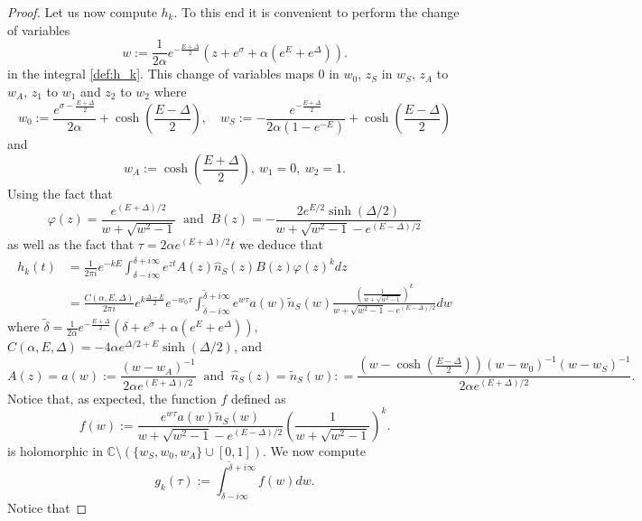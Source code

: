 \documentclass{article}
\numberwithin{equation}{section}
\theoremstyle{plain}
\begin{document}
\begin{proof}
Let us now compute $h_k$. To this end it is convenient to perform the change of variables
\[
w:= \frac{1}{2 \alpha}  e^{ - \frac{E+ \Delta}{2}} \left( z+ e^\sigma + \alpha (e^{E} + e^{\Delta} )  \right).
\]
in the integral \eqref{def:h_k}. 
This change of variables maps $0 $ in $w_0$, $z_S $ in $w_S $, $z_A $ to $w_A$, $z_1$ to $w_1 $ and $z_2 $ to $w_2 $ where  
\begin{equation} \label{poles in new variables}
w_0:=\frac{e^{ \sigma - \frac{E+ \Delta}{2}}}{2 \alpha}    + \cosh\left( \frac{E- \Delta}{2}\right), \quad  w_S := -    \frac{e^{ - \frac{E+ \Delta}{2}}}{2 \alpha(1- e^{-E})}+   \cosh\left( \frac{E- \Delta}{2}\right)
\end{equation}
and 
\[
w_A:= \cosh \left( \frac{E+ \Delta }{2}\right), \ w_1=0, \ w_2=1. 
\] 
Using the fact that 
\[
\varphi(z)= \frac{e^{(E+\Delta )/2 }}{w+\sqrt{w^2-1 }} \  \text{ and } \ B(z)= -   \frac{ 2 e^{E/2} \sinh(\Delta/2)}{ w+ \sqrt{w^2-1}- e^{(E-\Delta)/2}} 
\] 
as well as the fact that $\tau = 2 \alpha e^{(E+\Delta )/2} t$ we deduce that 
\begin{align*}
h_k(t)&=  \frac{1}{2 \pi i } e^{- k E } \int_{\delta - i \infty }^{\delta + i \infty } e^{ zt } A(z) \hat{n}_S(z) B(z) \varphi(z)^k dz\\
&= \frac{C(\alpha, E, \Delta)}{2 \pi i } e^{k \frac{\Delta - E }{2}}e^{- w_0 \tau }\int_{\tilde{\delta} - i \infty }^{\tilde{\delta} + i \infty } e^{ w \tau  } a(w) \tilde{n}_S(w) \frac{ \left(  \frac{1}{w + \sqrt{w^2-1}} \right)^k}{ w+ \sqrt{w^2-1}- e^{(E-\Delta)/2}} dw
\end{align*}
where $ \tilde{\delta} =  \frac{1}{2 \alpha}  e^{ - \frac{E+ \Delta}{2}} \left( \delta + e^\sigma + \alpha (e^{E} + e^{\Delta} )  \right)$, $
C(\alpha, E, \Delta)= -4 \alpha  e^{ \Delta/2 + E } \sinh(\Delta/2)$,
and 
\begin{equation} \label{a}
A(z)=a(w):= \frac{(w-w_A)^{-1}}{ 2 \alpha e^{(E+\Delta)/2 } }  \ \text{ and }  \ \hat{n}_S(z)= \tilde{n}_S (w): = \frac{\left(w- \cosh\left( \frac{E- \Delta }{2} \right) \right) (w-w_0)^{-1} (w-w_S)^{-1}}{2\alpha e^{(E+\Delta )/2 }} . 
\end{equation}
Notice that, as expected, the function $f$ defined as 
\[
f(w):= \frac{ e^{ w \tau  } a(w) \tilde{n}_S(w)}{ w+ \sqrt{w^2-1}- e^{(E-\Delta)/2}} \left(  \frac{1}{w + \sqrt{w^2-1}} \right)^k. 
\]
is holomorphic in $\mathbb C \setminus \left( \{ w_S, w_0, w_A   \} \cup [0, 1 ] \right) $. 
We now compute
\[
g_k (\tau):= \int_{\tilde{\delta} - i \infty }^{\tilde{\delta} + i \infty } f(w)  dw.
\]
Notice that 

\end{proof}
\end{document}
